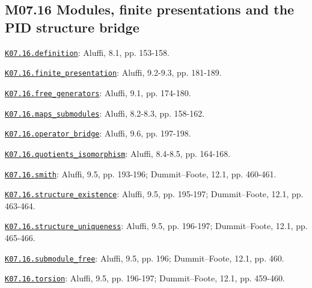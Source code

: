 \subsection*{M07.16 Modules, finite presentations and the PID structure bridge}
\par\smallskip\noindent\hypertarget{src:K07.16.definition}{}\label{src:K07.16.definition}\hyperref[K07.16.definition]{\texttt{K07.16.definition}}: Aluffi, 8.1, pp. 153-158.
\par\smallskip\noindent\hypertarget{src:K07.16.finite_presentation}{}\label{src:K07.16.finite_presentation}\hyperref[K07.16.finite_presentation]{\texttt{K07.16.finite\_presentation}}: Aluffi, 9.2-9.3, pp. 181-189.
\par\smallskip\noindent\hypertarget{src:K07.16.free_generators}{}\label{src:K07.16.free_generators}\hyperref[K07.16.free_generators]{\texttt{K07.16.free\_generators}}: Aluffi, 9.1, pp. 174-180.
\par\smallskip\noindent\hypertarget{src:K07.16.maps_submodules}{}\label{src:K07.16.maps_submodules}\hyperref[K07.16.maps_submodules]{\texttt{K07.16.maps\_submodules}}: Aluffi, 8.2-8.3, pp. 158-162.
\par\smallskip\noindent\hypertarget{src:K07.16.operator_bridge}{}\label{src:K07.16.operator_bridge}\hyperref[K07.16.operator_bridge]{\texttt{K07.16.operator\_bridge}}: Aluffi, 9.6, pp. 197-198.
\par\smallskip\noindent\hypertarget{src:K07.16.quotients_isomorphism}{}\label{src:K07.16.quotients_isomorphism}\hyperref[K07.16.quotients_isomorphism]{\texttt{K07.16.quotients\_isomorphism}}: Aluffi, 8.4-8.5, pp. 164-168.
\par\smallskip\noindent\hypertarget{src:K07.16.smith}{}\label{src:K07.16.smith}\hyperref[K07.16.smith]{\texttt{K07.16.smith}}: Aluffi, 9.5, pp. 193-196; Dummit--Foote, 12.1, pp. 460-461.
\par\smallskip\noindent\hypertarget{src:K07.16.structure_existence}{}\label{src:K07.16.structure_existence}\hyperref[K07.16.structure_existence]{\texttt{K07.16.structure\_existence}}: Aluffi, 9.5, pp. 195-197; Dummit--Foote, 12.1, pp. 463-464.
\par\smallskip\noindent\hypertarget{src:K07.16.structure_uniqueness}{}\label{src:K07.16.structure_uniqueness}\hyperref[K07.16.structure_uniqueness]{\texttt{K07.16.structure\_uniqueness}}: Aluffi, 9.5, pp. 196-197; Dummit--Foote, 12.1, pp. 465-466.
\par\smallskip\noindent\hypertarget{src:K07.16.submodule_free}{}\label{src:K07.16.submodule_free}\hyperref[K07.16.submodule_free]{\texttt{K07.16.submodule\_free}}: Aluffi, 9.5, pp. 196; Dummit--Foote, 12.1, pp. 460.
\par\smallskip\noindent\hypertarget{src:K07.16.torsion}{}\label{src:K07.16.torsion}\hyperref[K07.16.torsion]{\texttt{K07.16.torsion}}: Aluffi, 9.5, pp. 196-197; Dummit--Foote, 12.1, pp. 459-460.
